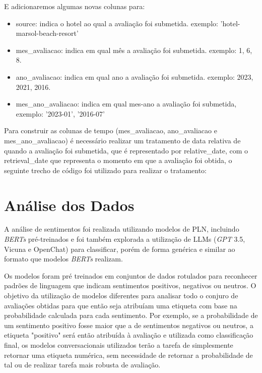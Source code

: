 E adicionaremos algumas novas colunas para:

\begin{itemize}
	\item source: indica o hotel ao qual a avaliação foi submetida. exemplo: 'hotel-marsol-beach-resort'
	\item mes\_avaliacao: indica em qual mês a avaliação foi submetida. exemplo: 1, 6, 8.
	\item ano\_avaliacao: indica em qual ano a avaliação foi submetida. exemplo: 2023, 2021, 2016.
	\item mes\_ano\_avaliacao: indica em qual mes-ano a avaliação foi submetida, exemplo: '2023-01', '2016-07'
\end{itemize}

Para construir as colunas de tempo (mes\_avaliacao, ano\_avaliacao e mes\_ano\_avaliacao) é necessário realizar um tratamento de data relativa de quando a avaliação foi submetida, que é representado por relative\_date, com o retrieval\_date que representa o momento em que a avaliação foi obtida, o seguinte trecho de código foi utilizado para realizar o tratamento:



\section{Análise dos Dados}
\label{cap:metodologia:sec:analise_dados}

A análise de sentimentos foi realizada utilizando modelos de PLN, incluindo \textit{BERTs} pré-treinados e foi também explorada a utilização de LLMs (\textit{GPT} 3.5, Vicuna e OpenChat) para classificar, porém de forma genérica e similar ao formato que modelos \textit{BERTs} realizam.

Os modelos foram pré treinados em conjuntos de dados rotulados para reconhecer padrões de linguagem que indicam sentimentos positivos, negativos ou neutros. O objetivo da utilização de modelos diferentes para analisar todo o conjuro de avaliações obtidas para que então seja atribuíam uma etiqueta com base na probabilidade calculada para cada sentimento. Por exemplo, se a probabilidade de um sentimento positivo fosse maior que a de sentimentos negativos ou neutros, a etiqueta "positivo" será então atribuída à avaliação e utilizada como classificação final, os modelos conversacionais utilizados terão a tarefa de simplesmente retornar uma etiqueta numérica, sem necessidade de retornar a probabilidade de tal ou de realizar tarefa mais robusta de avaliação.

